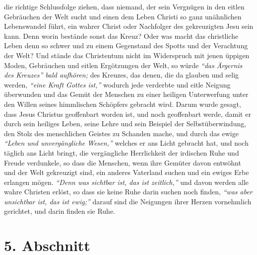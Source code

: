 die richtige Schlussfolge ziehen, dass niemand, der sein Vergnügen in den eitlen
Gebräuchen der Welt sucht und einen dem Leben Christi so ganz unähnlichen
Lebenswandel führt, ein wahrer Christ oder Nachfolger des gekreuzigten Jesu sein
kann. Denn worin bestände sonst das Kreuz? Oder was macht das christliche
Leben denn so schwer und zu einem Gegenstand des Spotts und der Verachtung der
Welt? Und stände das Christentum nicht im Widerspruch mit jenen üppigen Moden,
Gebräuchen und eitlen Ergötzungen der Welt, so würde
\textit{"`das Ärgernis des Kreuzes"' bald aufhören;}
des Kreuzes, das denen, die da glauben und
selig werden,
\textit{"`eine Kraft Gottes ist,"'}
wodurch jede
verderbte und eitle Neigung überwunden und das Gemüt der Menschen zu einer
heiligen Unterwerfung unter den Willen seines himmlischen Schöpfers gebracht
wird. Darum wurde gesagt, dass Jesus Christus geoffenbart worden ist, und noch
geoffenbart werde, damit er durch sein heiliges Leben, seine Lehre und sein
Beispiel der Selbstüberwindung, den Stolz des menschlichen Geistes zu Schanden
mache,
und durch das ewige \textit{"`Leben und unvergängliche
Wesen,"'} welches er ans Licht gebracht hat, und noch täglich ans
Licht bringt,
die vergängliche Herrlichkeit der irdischen Ruhe und Freude
verdunkele,
so dass die Menschen, wenn ihre
Gemüter davon entwöhnt und der Welt gekreuzigt sind, ein anderes Vaterland
suchen und ein ewiges Erbe erlangen mögen.
\textit{"`Denn was sichtbar ist, das ist zeitlich,"'}
und davon werden alle wahre Christen erlöst,
so dass sie keine Ruhe darin suchen noch finden,
\textit{"`was aber unsichtbar ist, das
ist ewig;"'} darauf sind die Neigungen ihrer Herzen vornehmlich gerichtet, und
darin finden sie Ruhe.

\section{5. Abschnitt} \label{kap16_ab5}

